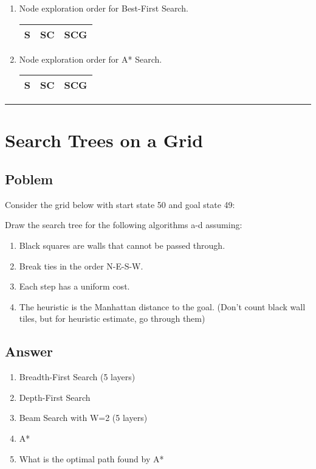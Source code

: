 \documentclass[11pt]{article}
\begin{document}
\begin{flushleft}
\begin{enumerate}
    \item Node exploration order for Best-First Search.\\
        \begin{tabular}{| c | c | c |}
            \hline
            S & SC & SCG\\
            \hline
        \end{tabular}

    \item Node exploration order for A* Search.\\
        \begin{tabular}{| c | c | c |}
            \hline
            S & SC & SCG\\
            \hline
        \end{tabular}

\end{enumerate}


\hspace{1cm}
\hrule
\section*{Search Trees on a Grid}

\subsection*{Poblem}
Consider the grid below with start state 50 and goal state 49:

Draw the search tree for the following algorithms a-d assuming: 
\begin{enumerate}
    \item Black squares are walls that cannot be passed through. 
    \item Break ties in the order N-E-S-W.
    \item Each step has a uniform cost.
    \item The heuristic is the Manhattan distance to the goal. (Don’t count
        black wall tiles, but for heuristic estimate, go through them)
\end{enumerate}

\subsection*{Answer}
\begin{enumerate}
    \item Breadth-First Search (5 layers)
    \item Depth-First Search
    \item Beam Search with W=2 (5 layers)
    \item A*
    \item What is the optimal path found by A*
\end{enumerate}

\end{flushleft}
\end{document}
